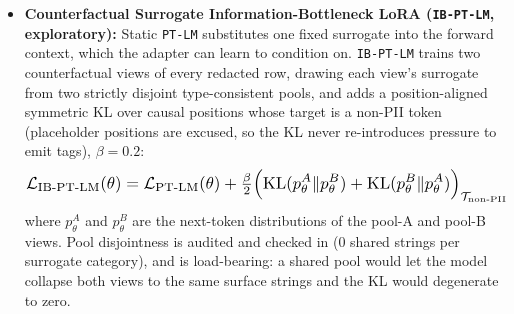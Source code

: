 \documentclass{article}
\begin{document}
\begin{itemize}
 The name is operational: gradient allocation into the placeholder subspace was not measured directly, and a surface-format imitation account, in which the adapter copies a frequent literal string present in the targets, predicts the same tag echoes and is removed by the same fix. No measured mechanism is claimed. To remove this failure mode at the loss level, Versieve's \texttt{perceive()} tokenizer (\texttt{computePtlmMaskedSpans}) implements \textbf{Privacy-Token Loss Masking (\texttt{PT-LM})}:
    \begin{equation}
      \mathcal{L}_{\text{PT-LM}}(\theta) = -\sum_{t \in \mathcal{T}_{\text{asst}} \setminus \mathcal{T}_{\mathcal{P}}} \log p_{\theta}\!\left(y_t \mid x,\; \tilde{y}_{<t}\right),
    \end{equation}
    where all subword indices $t \in \mathcal{T}_{\mathcal{P}}$ belonging to redacted placeholder spans are masked in the backward loss tensor ($\texttt{labels}[t] = -100$) and mapped in the forward context $\tilde{y}_{<t}$ to natural grammatical role surrogates $g(\text{type})$ (e.g., \textit{``the designated individual''}) while retaining zero raw PII in $\texttt{input\_ids}$. The abstention turns are the same $10\%$ explicit abstention turns already present in both \texttt{T2-Chat} arms. The mask covers $5.72\%$--$5.78\%$ of assistant target subwords ($2{,}655$ per arm). Because $\partial \mathcal{L}_{\text{PT-LM}} / \partial z_{t, v} = 0$ for all $t \in \mathcal{T}_{\mathcal{P}}$, the adapter receives zero gradient pressure to emit \texttt{<PII:...>} tags while preserving identical Carlini canary protection.
\item \textbf{Counterfactual Surrogate Information-Bottleneck LoRA (\texttt{IB-PT-LM}, exploratory):} Static \texttt{PT-LM} substitutes one fixed surrogate into the forward context, which the adapter can learn to condition on. \texttt{IB-PT-LM} trains two counterfactual views of every redacted row, drawing each view's surrogate from two strictly disjoint type-consistent pools, and adds a position-aligned symmetric KL over causal positions whose target is a non-PII token (placeholder positions are excused, so the KL never re-introduces pressure to emit tags), $\beta{=}0.2$:
    \begin{equation}
      \resizebox{\linewidth}{!}{$\displaystyle
      \mathcal{L}_{\text{IB-PT-LM}}(\theta) = \mathcal{L}_{\text{PT-LM}}(\theta) + \tfrac{\beta}{2}\Big(\mathrm{KL}(p^{A}_\theta \| p^{B}_\theta) + \mathrm{KL}(p^{B}_\theta \| p^{A}_\theta)\Big)_{\mathcal{T}_{\text{non-PII}}}$}
    \end{equation}
    where $p^{A}_\theta$ and $p^{B}_\theta$ are the next-token distributions of the pool-A and pool-B views. Pool disjointness is audited and checked in ($0$ shared strings per surrogate category), and is load-bearing: a shared pool would let the model collapse both views to the same surface strings and the KL would degenerate to zero.
\end{itemize}
\end{document}
